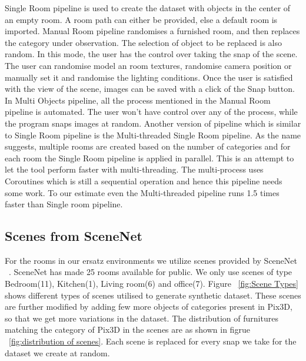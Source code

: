 Single Room pipeline is used to create the dataset with objects in the center of an empty room.
A room path can either be provided, else a default room is imported.
Manual Room pipeline randomises a furnished room, and then replaces the category under observation.
The selection of object to be replaced is also random.
In this mode, the user has the control over taking the snap of the scene.
The user can randomise model an room textures, randomise camera position or manually set it and randomise the lighting conditions.
Once the user is satisfied with the view of the scene, images can be saved with a click of the Snap button.
In Multi Objects pipeline, all the process mentioned in the Manual Room pipeline is automated.
The user won't have control over any of the process, while the program snaps images at random.
Another version of pipeline which is similar to Single Room pipeline is the Multi-threaded Single Room pipeline.
As the name suggests, multiple rooms are created based on the number of categories and for each room the Single Room pipeline is applied in parallel.
This is an attempt to let the tool perform faster with multi-threading.
The multi-process uses Coroutines which is still a sequential operation and hence this pipeline needs some work.
To our estimate even the Multi-threaded pipeline runs 1.5 times faster than Single room pipeline.

\subsection{Scenes from SceneNet}
For the rooms in our ersatz environments we utilize scenes provided by SceneNet ~\cite{McCormac:etal:ICCV2017}.
SceneNet has made 25 rooms available for public.
We only use scenes of type Bedroom(11), Kitchen(1), Living room(6) and office(7).
Figure ~\ref{fig:Scene Types} shows different types of scenes utilised to generate synthetic dataset.
These scenes are further modified by adding few more objects of categories present in Pix3D, so that we get more variations in the dataset.
The distribution of furnitures matching the category of Pix3D in the scenes are as shown in figrue ~\ref{fig:distribution of scenes}.
Each scene is replaced for every snap we take for the dataset we create at random.

